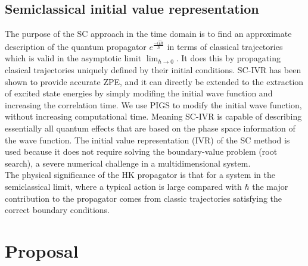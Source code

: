 \documentclass[12pt,letterpaper,oneside,final,titlepage]{article}               %
\numberwithin{equation}{section} %
\newcommand{\emiHt}{e^{\frac{-i\hat{H}t}{\hbar}}}
\begin{document}
\subsection{Semiclassical initial value representation}
The purpose of the SC approach in the time domain is to find an approximate description of the quantum propagator $\emiHt$ 
in terms of classical trajectories which is valid in the asymptotic limit $\lim_{\hbar \to 0}$.
It does this by propagating clasical trajectories uniquely defined by their initial conditions.
SC-IVR has been shown to provide accurate ZPE, and it can directly be extended to the extraction of excited state energies by simply modifing the initial wave function and increasing the correlation time. 
We use PIGS to modify the initial wave function, without increasing computational time. 
Meaning SC-IVR is capable of describing essentially all quantum effects that are based on the phase space information of the wave function.
The initial value representation (IVR) of the SC method is used because it does not require solving the boundary-value problem (root search), a severe numerical challenge in a multidimensional system. \\
The physical significance of the HK propagator is that for a system in the semiclassical limit, where a typical action is large compared with $\hbar$ the major contribution to the propagator comes from classic trajectories satisfying the correct boundary conditions.




\section{Proposal}
\end{document}
